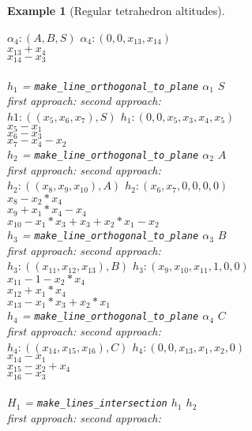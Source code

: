 \documentclass[final,1p,times,authoryear]{elsarticle}
\newtheorem{example}[theorem]{Example}
\begin{document}
\begin{example}[Regular tetrahedron altitudes]
\begin{footnotesize}
\begin{tabbing}
\>\> $\alpha_4: (A, B, S)$ \>\> $\alpha_4 : (0, 0, x_{13}, x_{14})$ \\
  \>\> \>\> $x_{13}  +  x_4$ \\
 \>\> \>\>  $x_{14}  -  x_3$ \\
 \\
\> $h_1$ = {\tt make\_line\_orthogonal\_to\_plane} $\alpha_1$ $S$ \\
\>\> first approach: \>\>second approach: \\
\>\> $h1: ((x_5, x_6, x_7), S) $ \>\>$h_1: (0, 0, x_5, x_3, x_4, x_5)$ \\
\>\> $x_5 - x_1$ \\
\>\> $x_6  -  x_3$ \\
\>\> $x_7  -  x_4  -  x_2$ \\
\> $h_2$ = {\tt make\_line\_orthogonal\_to\_plane} $\alpha_2$ $A$ \\
\>\> first approach: \>\>second approach: \\
\>\> $h_2 : ((x_8, x_9, x_{10}), A)$ \>\>$h_2: (x_6, x_7, 0, 0, 0, 0) $ \\
\>\> $x_8  -  x_2*x_4$ \\
\>\> $x_9  +  x_1*x_4  -  x_4$ \\
\>\> $x_{10}  -  x_1*x_3  +  x_3  +  x_2*x_1  -  x_2$ \\
\> $h_3$ = {\tt make\_line\_orthogonal\_to\_plane} $\alpha_3$ $B$ \\
\>\> first approach: \>\>second approach: \\
\>\> $h_3 : ((x_{11}, x_{12}, x_{13}), B)$ \>\>$h_3: (x_9, x_{10}, x_{11}, 1, 0, 0)$ \\
\>\> $x_{11}  -1  -  x_2*x_4$ \\
\>\> $x_{12}  +  x_1*x_4$ \\
\>\> $x_{13}  -  x_1*x_3  +  x_2*x_1$ \\
\> $h_4$ = {\tt make\_line\_orthogonal\_to\_plane} $\alpha_4$ $C$ \\
\>\> first approach: \>\> second approach: \\
\>\> $h_4 : ((x_{14}, x_{15}, x_{16}), C) $ \>\>$h_4: (0, 0, x_{13}, x_1, x_2, 0)$ \\
\>\> $x_{14}  -  x_1$ \\
\>\> $x_{15}  -  x_2  +  x_4$ \\
\>\> $x_{16}  -  x_3$ \\
 \\
\> $H_1$ = {\tt make\_lines\_intersection} $h_1$ $h_2$ \\
\>\> first approach: \>\>second approach: \\

\end{tabbing}
\end{footnotesize}
\end{example}
\end{document}

